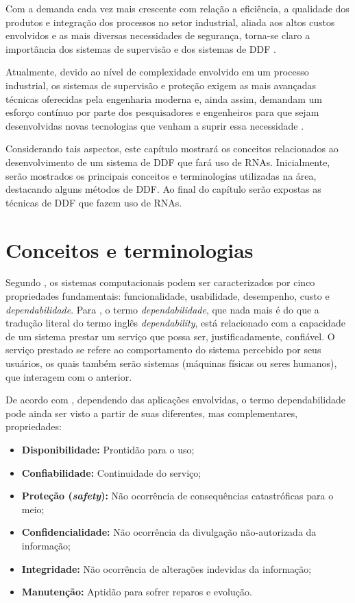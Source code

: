 \label{cap:detec_diag}

Com a demanda cada vez mais crescente com relação a eficiência, a qualidade dos
produtos e integração dos processos no setor industrial, aliada aos altos custos
envolvidos e as mais diversas necessidades de segurança, torna-se claro a
importância dos sistemas de supervisão e dos sistemas de DDF
\cite{isermann:2006}.

Atualmente, devido ao nível de complexidade envolvido em um processo industrial,
os sistemas de supervisão e proteção exigem as mais avançadas técnicas
oferecidas pela engenharia moderna e, ainda assim, demandam um esforço contínuo
por parte dos pesquisadores e engenheiros para que sejam desenvolvidas novas
tecnologias que venham a suprir essa necessidade \cite{silva:2008}.

Considerando tais aspectos, este capítulo mostrará os conceitos relacionados ao
desenvolvimento de um sistema de DDF que fará uso de RNAs. Inicialmente, serão
mostrados os principais conceitos e terminologias utilizadas na área, destacando
alguns métodos de DDF. Ao final do capítulo serão expostas as técnicas de DDF
que fazem uso de RNAs.

\section{Conceitos e terminologias}\label{sec:propriedades}
Segundo , os sistemas computacionais podem ser
caracterizados por cinco propriedades fundamentais: funcionalidade, usabilidade,
desempenho, custo e {\it dependabilidade}. Para , o
termo {\it dependabilidade}, que nada mais é do que a tradução literal do termo
inglês {\it dependability}, está relacionado com a capacidade de um sistema
prestar um serviço que possa ser, justificadamente, confiável. O serviço
prestado se refere ao comportamento do sistema percebido por seus usuários, os
quais também serão sistemas (máquinas físicas ou seres humanos), que interagem
com o anterior.

De acordo com , dependendo das aplicações envolvidas, o
termo dependabilidade pode ainda ser visto a partir de suas diferentes, mas
complementares, propriedades:

\begin{itemize}
    \item {\bf Disponibilidade:} Prontidão para o uso;
    \item {\bf Confiabilidade:} Continuidade do serviço;
    \item \textbf{Proteção (\textit{safety}):} Não ocorrência de consequências
          catastróficas para o meio;
    \item {\bf Confidencialidade:} Não ocorrência da divulgação não-autorizada
          da informação;
    \item {\bf Integridade:} Não ocorrência de alterações indevidas da
          informação;
    \item {\bf Manutenção:} Aptidão para sofrer reparos e evolução.
\end{itemize}

